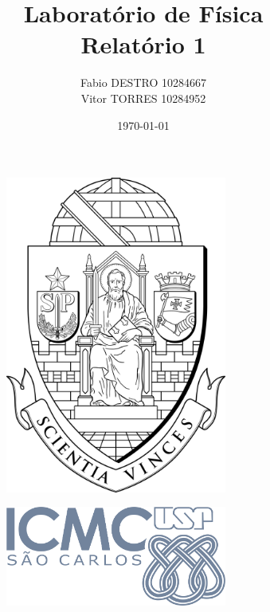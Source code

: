 \documentclass{article}
\title{{\huge Laboratório de Física}\\{\Large Relatório 1}}
\author{Fabio DESTRO 10284667\\Vitor TORRES 10284952\\}
\date{\today}
\begin{document}
\begin{figure}[t]
	\begin{subfigure}{0.49\textwidth}
		\centering
		\includegraphics[width=0.8\textwidth]{brasao_usp_pb.png}
	\end{subfigure}
	\hfill
	\begin{subfigure}{0.49\textwidth}
		\centering
		\includegraphics[width=0.8\textwidth]{LOGO_ICMC_RGB.png}
	\end{subfigure}
\end{figure}
\end{document}
